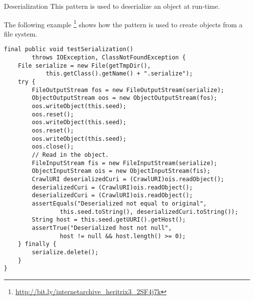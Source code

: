 \begin{pattern}{Deserialization}
This pattern is used to deserialize an object at run-time.

\instances{}
The following example%
\footnote{\url{http://bit.ly/internetarchive_heritrix3_2SF4j7k}}
shows how the \thisp{} pattern is used to create objects from a file system.

\begin{verbatim}
final public void testSerialization()
        throws IOException, ClassNotFoundException {
    File serialize = new File(getTmpDir(),
            this.getClass().getName() + ".serialize");
    try {
        FileOutputStream fos = new FileOutputStream(serialize);
        ObjectOutputStream oos = new ObjectOutputStream(fos);
        oos.writeObject(this.seed);
        oos.reset();
        oos.writeObject(this.seed);
        oos.reset();
        oos.writeObject(this.seed);
        oos.close();
        // Read in the object.
        FileInputStream fis = new FileInputStream(serialize);
        ObjectInputStream ois = new ObjectInputStream(fis);
        CrawlURI deserializedCuri = (CrawlURI)ois.readObject();
        deserializedCuri = (CrawlURI)ois.readObject();
        deserializedCuri = (CrawlURI)ois.readObject();
        assertEquals("Deserialized not equal to original",
                this.seed.toString(), deserializedCuri.toString());
        String host = this.seed.getUURI().getHost();
        assertTrue("Deserialized host not null",
                host != null && host.length() >= 0);
    } finally {
        serialize.delete();
    }
}
\end{verbatim}

\detection{}

\discussion{}

\related{}

\end{pattern}